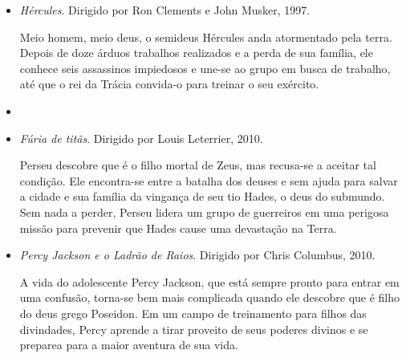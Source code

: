 \documentclass[11pt]{extarticle}
\begin{document}
\begin{itemize}
\item \textit{Hércules}. Dirigido por Ron Clements e John Musker, 1997.

Meio homem, meio deus, o semideus Hércules anda atormentado pela terra. Depois de doze árduos trabalhos realizados e a perda de sua família, ele conhece seis assassinos impiedosos e une-se ao grupo em busca de trabalho, até que o rei da Trácia convida-o para treinar o seu exército.

\item \item \textit{Fúria de titãs}. Dirigido por Louis Leterrier, 2010.

Perseu descobre que é o filho mortal de Zeus, mas recusa-se a aceitar tal condição. Ele encontra-se entre a batalha dos deuses e sem ajuda para salvar a cidade e sua família da vingança de seu tio Hades, o deus do submundo. Sem nada a perder, Perseu lidera um grupo de guerreiros em uma perigosa missão para prevenir que Hades cause uma devastação na Terra.

\item \textit{Percy Jackson e o Ladrão de Raios}. Dirigido por Chris Columbus, 2010.

A vida do adolescente Percy Jackson, que está sempre pronto para entrar em uma confusão, torna-se bem mais complicada quando ele descobre que é filho do deus grego Poseidon. Em um campo de treinamento para filhos das divindades, Percy aprende a tirar proveito de seus poderes divinos e se preparea para a maior aventura de sua vida.

\end{itemize}
\end{document}
